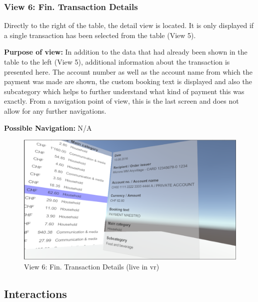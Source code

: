 \subsubsection{View 6: Fin. Transaction Details}

Directly to the right of the table, the detail view is located. It is only displayed if a single transaction has been selected from the table (View 5).

\textbf{Purpose of view:} In addition to the data that had already been shown in the table to the left (View 5), additional information about the transaction is presented here. The account number as well as the account name from which the payment was made are shown, the custom booking text is displayed and also the subcategory which helps to further understand what kind of payment this was exactly. From a navigation point of view, this is the last screen and does not allow for any further navigations.

\textbf{Possible Navigation:} N/A

\begin{figure}[h]
	\begin{center}
		\includegraphics[width=12cm]{03_Figures/08_Development/View6_FinTransactionDetails.png}
		\caption{View 6: Fin. Transaction Details (live in \gls{vr})}
		\label{fig:unityview6}
	\end{center}
\end{figure}


\subsection{Interactions}

